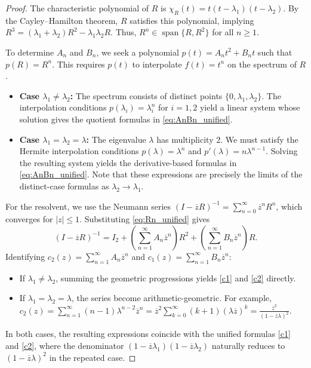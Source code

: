 \documentclass[12pt, reqno]{amsart}
\theoremstyle{definition}
\theoremstyle{remark}
\numberwithin{equation}{section}
\begin{document}
\begin{proof}
	The characteristic polynomial of $R$ is $\chi_R(t) = t(t-\lambda_1)(t-\lambda_2)$. By the Cayley--Hamilton theorem, $R$ satisfies this polynomial, implying $R^3 = (\lambda_1+\lambda_2)R^2 - \lambda_1\lambda_2 R$. Thus, $R^n \in \operatorname{span}\{R, R^2\}$ for all $n \geq 1$.
	
	To determine $A_n$ and $B_n$, we seek a polynomial $p(t) = A_n t^2 + B_n t$ such that $p(R) = R^n$. This requires $p(t)$ to interpolate $f(t)=t^n$ on the spectrum of $R$.
	\begin{itemize}
		\item \textbf{Case $\lambda_1 \neq \lambda_2$:} The spectrum consists of distinct points $\{0, \lambda_1, \lambda_2\}$. The interpolation conditions $p(\lambda_i) = \lambda_i^n$ for $i=1,2$ yield a linear system whose solution gives the quotient formulas in \eqref{eq:AnBn_unified}.
		\item \textbf{Case $\lambda_1 = \lambda_2 = \lambda$:} The eigenvalue $\lambda$ has multiplicity $2$. We must satisfy the Hermite interpolation conditions $p(\lambda) = \lambda^n$ and $p'(\lambda) = n\lambda^{n-1}$. Solving the resulting system yields the derivative-based formulas in \eqref{eq:AnBn_unified}. Note that these expressions are precisely the limits of the distinct-case formulas as $\lambda_2 \to \lambda_1$.
	\end{itemize}
	
	For the resolvent, we use the Neumann series $(I-\overline{z}R)^{-1} = \sum_{n=0}^\infty \overline{z}^n R^n$, which converges for $|z| \leq 1$. Substituting \eqref{eq:Rn_unified} gives
	\[
	(I-\overline{z}R)^{-1} = I_2 + \left(\sum_{n=1}^\infty A_n \overline{z}^n\right) R^2 + \left(\sum_{n=1}^\infty B_n \overline{z}^n\right) R.
	\]
	Identifying $c_2(z) = \sum_{n=1}^\infty A_n \overline{z}^n$ and $c_1(z) = \sum_{n=1}^\infty B_n \overline{z}^n$:
	\begin{itemize}
		\item If $\lambda_1 \neq \lambda_2$, summing the geometric progressions yields \eqref{c1} and \eqref{c2} directly.
		\item If $\lambda_1 = \lambda_2 = \lambda$, the series become arithmetic-geometric. For example, $c_2(z) = \sum_{n=1}^\infty (n-1)\lambda^{n-2}\overline{z}^n = \overline{z}^2 \sum_{k=0}^\infty (k+1)(\lambda\overline{z})^k = \frac{\overline{z}^2}{(1-\overline{z}\lambda)^2}$.
	\end{itemize}
	In both cases, the resulting expressions coincide with the unified formulas \eqref{c1} and \eqref{c2}, where the denominator $(1-\overline{z}\lambda_1)(1-\overline{z}\lambda_2)$ naturally reduces to $(1-\overline{z}\lambda)^2$ in the repeated case.
\end{proof}
\end{document}
